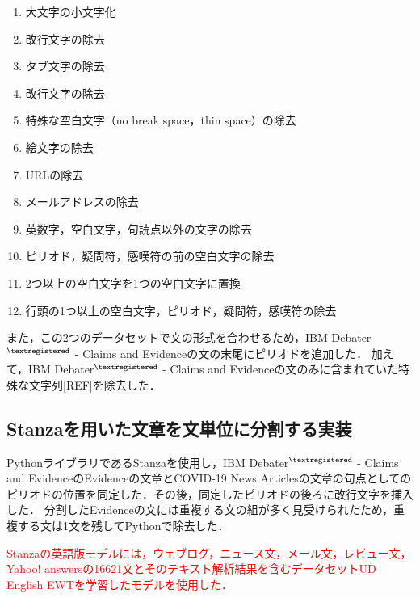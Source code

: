 \documentclass[12pt,a4j]{jreport}
\begin{document}
\begin{multicols}{2}
  \begin{enumerate}
  \item 大文字の小文字化
  \item 改行文字の除去
  \item タブ文字の除去
  \item 改行文字の除去
  \item 特殊な空白文字（no break space，thin space）の除去
  \item 絵文字の除去
  \columnbreak
  \item URLの除去
  \item メールアドレスの除去
  \item 英数字，空白文字，句読点以外の文字の除去
  \item ピリオド，疑問符，感嘆符の前の空白文字の除去
  \item 2つ以上の空白文字を1つの空白文字に置換
  \item 行頭の1つ以上の空白文字，ピリオド，疑問符，感嘆符の除去
  \end{enumerate}
\end{multicols}

また，この2つのデータセットで文の形式を合わせるため，IBM Debater$^{\textregistered}$ - Claims and Evidenceの文の末尾にピリオドを追加した．
加えて，IBM Debater$^{\textregistered}$ - Claims and Evidenceの文のみに含まれていた特殊な文字列[REF]を除去した．


\subsection{Stanzaを用いた文章を文単位に分割する実装}
PythonライブラリであるStanzaを使用し，IBM Debater$^{\textregistered}$ - Claims and EvidenceのEvidenceの文章とCOVID-19 News Articlesの文章の句点としてのピリオドの位置を同定した．その後，同定したピリオドの後ろに改行文字を挿入した．
分割したEvidenceの文には重複する文の組が多く見受けられたため，重複する文は1文を残してPythonで除去した．

\textcolor{red}{
  Stanzaの英語版モデルには，ウェブログ，ニュース文，メール文，レビュー文，Yahoo! answersの16621文とそのテキスト解析結果を含むデータセットUD English EWTを学習したモデルを使用した． 
}
\end{document}
